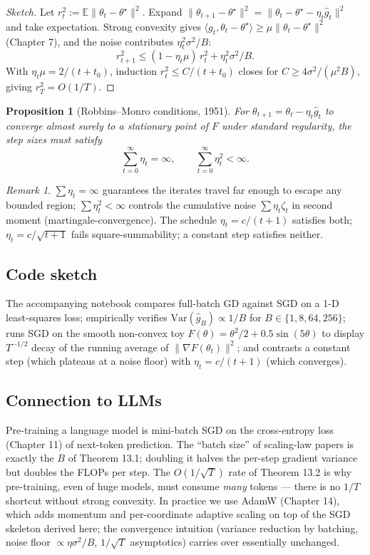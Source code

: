 \documentclass[11pt]{article}
\newtheorem{proposition}[theorem]{Proposition}
\theoremstyle{remark}
\newtheorem{remark}[theorem]{Remark}
\begin{document}
\begin{proof}[Sketch]
Let $r_t^2 := \mathbb{E}\|\theta_t - \theta^\star\|^2$. Expand $\|\theta_{t+1} - \theta^\star\|^2 = \|\theta_t - \theta^\star - \eta_t \hat g_t\|^2$ and take expectation. Strong convexity gives $\langle g_t, \theta_t - \theta^\star\rangle \geq \mu \|\theta_t - \theta^\star\|^2$ (Chapter 7), and the noise contributes $\eta_t^2 \sigma^2/B$:
\[
r_{t+1}^2 \leq (1 - \eta_t \mu)\, r_t^2 + \eta_t^2 \sigma^2 / B.
\]
With $\eta_t \mu = 2/(t + t_0)$, induction $r_t^2 \leq C/(t + t_0)$ closes for $C \geq 4 \sigma^2/(\mu^2 B)$, giving $r_T^2 = O(1/T)$.
\end{proof}

\begin{proposition}[Robbins--Monro conditions, 1951]
For $\theta_{t+1} = \theta_t - \eta_t \hat g_t$ to converge almost surely to a stationary point of $F$ under standard regularity, the step sizes must satisfy
\[
\sum_{t=0}^{\infty} \eta_t = \infty, \qquad \sum_{t=0}^{\infty} \eta_t^2 < \infty.
\]
\end{proposition}

\begin{remark}
$\sum \eta_t = \infty$ guarantees the iterates travel far enough to escape any bounded region; $\sum \eta_t^2 < \infty$ controls the cumulative noise $\sum \eta_t \zeta_t$ in second moment (martingale-convergence). The schedule $\eta_t = c/(t+1)$ satisfies both; $\eta_t = c/\sqrt{t+1}$ fails square-summability; a constant step satisfies neither.
\end{remark}

\subsection*{Code sketch}

The accompanying notebook compares full-batch GD against SGD on a 1-D least-squares loss; empirically verifies $\mathrm{Var}(\hat g_B) \propto 1/B$ for $B \in \{1, 8, 64, 256\}$; runs SGD on the smooth non-convex toy $F(\theta) = \theta^2/2 + 0.5\sin(5\theta)$ to display $T^{-1/2}$ decay of the running average of $\|\nabla F(\theta_t)\|^2$; and contrasts a constant step (which plateaus at a noise floor) with $\eta_t = c/(t+1)$ (which converges).

\subsection*{Connection to LLMs}

Pre-training a language model is mini-batch SGD on the cross-entropy loss (Chapter 11) of next-token prediction. The ``batch size'' of scaling-law papers is exactly the $B$ of Theorem 13.1; doubling it halves the per-step gradient variance but doubles the FLOPs per step. The $O(1/\sqrt{T})$ rate of Theorem 13.2 is why pre-training, even of huge models, must consume \emph{many} tokens --- there is no $1/T$ shortcut without strong convexity. In practice we use AdamW (Chapter 14), which adds momentum and per-coordinate adaptive scaling on top of the SGD skeleton derived here; the convergence intuition (variance reduction by batching, noise floor $\propto \eta \sigma^2/B$, $1/\sqrt{T}$ asymptotics) carries over essentially unchanged.
\end{document}
